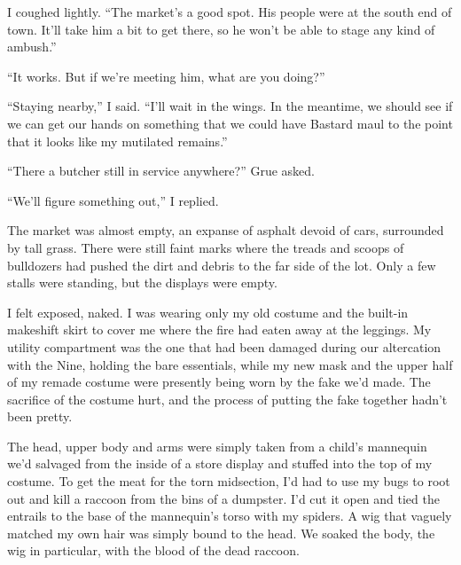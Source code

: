 I coughed lightly.  ``The market's a good spot.  His people were at the south end of town.  It'll take him a bit to get there, so he won't be able to stage any kind of ambush.''



``It works.  But if we're meeting him, what are you doing?''



``Staying nearby,'' I said.  ``I'll wait in the wings.  In the meantime, we should see if we can get our hands on something that we could have Bastard maul to the point that it looks like my mutilated remains.''



``There a butcher still in service anywhere?'' Grue asked.



``We'll figure something out,'' I replied.



\blacksquare



The market was almost empty, an expanse of asphalt devoid of cars, surrounded by tall grass.  There were still faint marks where the treads and scoops of bulldozers had pushed the dirt and debris to the far side of the lot.  Only a few stalls were standing, but the displays were empty.



I felt exposed, naked.  I was wearing only my old costume and the built-in makeshift skirt to cover me where the fire had eaten away at the leggings.  My utility compartment was the one that had been damaged during our altercation with the Nine, holding the bare essentials, while my new mask and the upper half of my remade costume were presently being worn by the fake we'd made.  The sacrifice of the costume hurt, and the process of putting the fake together hadn't been pretty.



The head, upper body and arms were simply taken from a child's mannequin we'd salvaged from the inside of a store display and stuffed into the top of my costume.  To get the meat for the torn midsection, I'd had to use my bugs to root out and kill a raccoon from the bins of a dumpster.  I'd cut it open and tied the entrails to the base of the mannequin's torso with my spiders.  A wig that vaguely matched my own hair was simply bound to the head.  We soaked the body, the wig in particular, with the blood of the dead raccoon.



